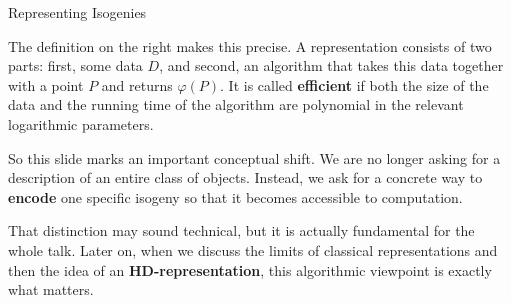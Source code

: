 \documentclass[aspectratio=169,notheorems]{beamer}
\begin{document}
\begin{frame}{Representing Isogenies}
{			The definition on the right makes this precise. A representation consists of two parts: first, some data \(D\), and second, an algorithm that takes this data together with a point \(P\) and returns \(\varphi(P)\). It is called \textbf{efficient} if both the size of the data and the running time of the algorithm are polynomial in the relevant logarithmic parameters.
			
			So this slide marks an important conceptual shift. We are no longer asking for a description of an entire class of objects. Instead, we ask for a concrete way to \textbf{encode} one specific isogeny so that it becomes accessible to computation.
			
			That distinction may sound technical, but it is actually fundamental for the whole talk. Later on, when we discuss the limits of classical representations and then the idea of an \textbf{HD-representation}, this algorithmic viewpoint is exactly what matters.
		}
	\end{frame}
	
\end{document}
